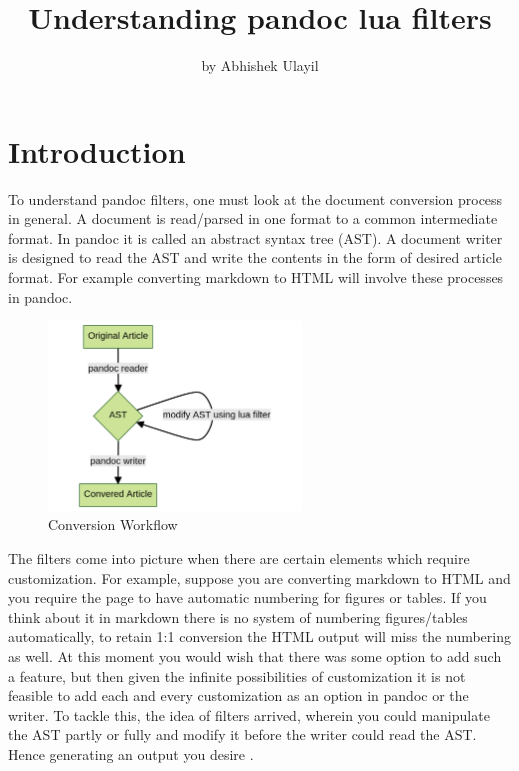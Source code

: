 \title{Understanding pandoc lua filters}
\author{by Abhishek Ulayil}

\maketitle


\section{Introduction}
To understand pandoc filters, one must look at the document conversion process in
general. A document is read/parsed in one format to a common intermediate format.
In pandoc it is called an abstract syntax tree (AST). A document writer is designed 
to read the AST and write the contents in the form of desired article format.
For example converting markdown to HTML will involve these processes in pandoc.

\begin{figure}[htbp]
  \centering
  \includegraphics[width=0.6\textwidth]{workflow.png}
  \caption{Conversion Workflow}
  \label{fig:workflow}
\end{figure}

The filters come into picture when there are certain elements which require 
customization. For example, suppose you are converting markdown to HTML and you
require the page to have automatic numbering for figures or tables. 
If you think about it in markdown there is no system of numbering figures/tables 
automatically, to retain 1:1 conversion the HTML output will miss the numbering as well. 
At this moment you would wish that there was some option to add such a feature,
but then given the infinite possibilities of customization it is not feasible to 
add each and every customization as an option in pandoc or the writer. 
To tackle this, the idea of filters arrived, wherein you could manipulate the AST
partly or fully and modify it before the writer could read the AST. Hence generating
an output you desire \citep{pandocfilters}.

